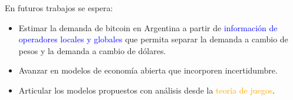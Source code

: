 \begin{frame}{}

En futuros trabajos se espera:
    \vspace{5mm}
\begin{itemize}
    \item[] Estimar la demanda de bitcoin en Argentina a partir de \textcolor{blue}{información de operadores locales y globales} que permita separar la demanda a cambio de pesos y la demanda a cambio de dólares.
        \vspace{5mm}
    \item[] Avanzar en modelos de economía abierta que incorporen \textcolor{dgreen}{incertidumbre}.
        \vspace{5mm}
    \item[] Articular los modelos propuestos con análisis desde la \textcolor{orange}{teoría de juegos}.  
    \end{itemize}
    
\note{
\begin{itemize}
    \item 
\end{itemize}
}
    
\end{frame}